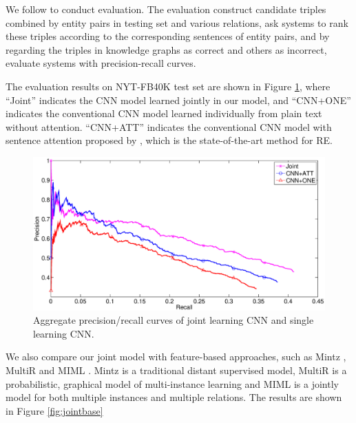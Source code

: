 \documentclass[11pt,a4paper]{article}
\begin{document}
We follow \cite{weston2013connecting} to conduct evaluation. The evaluation construct candidate triples combined by entity pairs in testing set and various relations, ask systems to rank these triples according to the corresponding sentences of entity pairs, and by regarding the triples in knowledge graphs as correct and others as incorrect, evaluate systems with precision-recall curves.

The evaluation results on NYT-FB40K test set are shown in Figure \ref{fig:jointcnn}, where ``Joint'' indicates the CNN model learned jointly in our model, and ``CNN+ONE'' indicates the conventional CNN model learned individually from plain text without attention. ``CNN+ATT'' indicates the conventional CNN model with sentence attention proposed by \cite{lin2016neural}, which is the state-of-the-art method for RE.


\begin{figure}[h]
\centering
\includegraphics[width=1\columnwidth]{jointcnn.eps}
\caption{Aggregate precision/recall curves of joint learning CNN and single learning CNN.}
\label{fig:jointcnn}
\end{figure} 

We also compare our joint model with feature-based approaches, such as Mintz \cite{mintz2009distant}, MultiR \cite{hoffmann2011knowledge} and MIML \cite{surdeanu2012multi}. Mintz is a traditional distant supervised model, MultiR is a probabilistic, graphical model of multi-instance learning and MIML is a jointly model for both multiple instances and multiple relations. The results are shown in Figure \ref{fig:jointbase}
\end{document}
